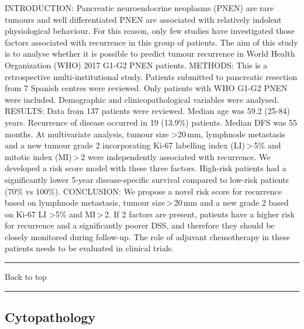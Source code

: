 \documentclass[]{article}
\begin{document}
INTRODUCTION: Pancreatic neuroendocrine neoplasms (PNEN) are rare
tumours and well differentiated PNEN are associated with relatively
indolent physiological behaviour. For this reason, only few studies have
investigated those factors associated with recurrence in this group of
patients. The aim of this study is to analyse whether it is possible to
predict tumour recurrence in World Health Organization (WHO) 2017 G1-G2
PNEN patients. METHODS: This is a retrospective multi-institutional
study. Patients submitted to pancreatic resection from 7 Spanish centres
were reviewed. Only patients with WHO G1-G2 PNEN were included.
Demographic and clinicopathological variables were analysed. RESULTS:
Data from 137 patients were reviewed. Median age was 59.2 (25-84) years.
Recurrence of disease occurred in 19 (13.9\%) patients. Median DFS was
55 months. At multivariate analysis, tumour size \textgreater{}20\,mm,
lymphnode metastasis and a new tumour grade 2 incorporating Ki-67
labelling index (LI)\,\textgreater{}\,5\% and mitotic index
(MI)\,\textgreater{}\,2 were independently associated with recurrence.
We developed a risk score model with these three factors. High-risk
patients had a significantly lower 5-year disease-specific survival
compared to low-risk patients (70\% vs 100\%). CONCLUSION: We propose a
novel risk score for recurrence based on lymphnode metastasis, tumour
size\,\textgreater{}\,20\,mm and a new grade 2 based on Ki-67 LI
\textgreater{}5\% and MI\,\textgreater{}\,2. If 2 factors are present,
patients have a higher risk for recurrence and a significantly poorer
DSS, and therefore they should be closely monitored during follow-up.
The role of adjuvant chemotherapy in these patients needs to be
evaluated in clinical trials.

{}

{}

\begin{center}\rule{0.5\linewidth}{\linethickness}\end{center}

Back to top

\begin{center}\rule{0.5\linewidth}{\linethickness}\end{center}

\pagebreak

\hypertarget{cytopathology}{%
\subsection{Cytopathology}\label{cytopathology}}
\end{document}
